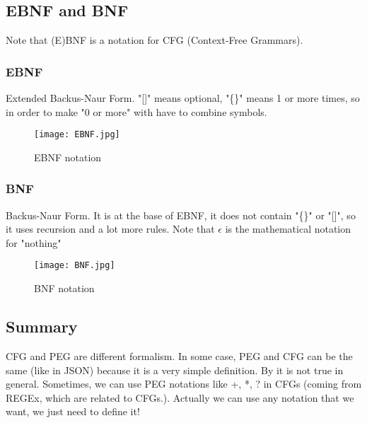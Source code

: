     \subsection{EBNF and BNF}
        Note that (E)BNF is a notation for CFG (Context-Free Grammars).
        \subsubsection{EBNF}
            Extended Backus-Naur Form. "[]" means optional, "\{\}" means 1 or more
            times, so in order to make "0 or more" with have to combine symbols.
            \begin{figure}[H]
                \centering
                \texttt{[image: EBNF.jpg]}
                \caption{EBNF notation}
                \label{fig:ebnf}
            \end{figure}
        \subsubsection{BNF}
            Backus-Naur Form. It is at the base of EBNF, it does not contain "\{\}"
            or "[]", so it uses recursion and a lot more rules. Note that $\epsilon$
            is the mathematical notation for "nothing"
            \begin{figure}[H]
                \centering
                \texttt{[image: BNF.jpg]}
                \caption{BNF notation}
                \label{fig:bnf}
            \end{figure}
    \subsection{Summary}
        CFG and PEG are different formalism. In some case, PEG and CFG can be
        the same (like in JSON) because it is a very simple definition. By it is
        not true in general. Sometimes, we can use PEG notations like +, *, ? in
        CFGs (coming from REGEx, which are related to CFGs.). Actually we can
        use any notation that we want, we just need to define it!